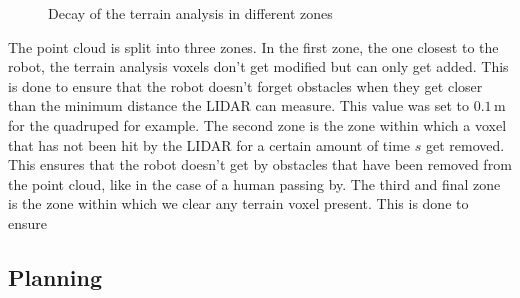 \documentclass[11pt]{article}
\begin{document}
        \begin{figure}[H]
            \centering
            \caption{Decay of the terrain analysis in different zones}
            \label{fig:decay}
        \end{figure}

        The point cloud is split into three zones. In the first zone, the one closest to the robot, the terrain analysis voxels don't get modified but can only get added. This is done to ensure that the robot doesn't forget obstacles when they get closer than the minimum distance the LIDAR can measure. This value was set to $0.1\,\text{m}$ for the quadruped for example.
        The second zone is the zone within which a voxel that has not been hit by the LIDAR for a certain amount of time $s$ get removed. This ensures that the robot doesn't get by obstacles that have been removed from the point cloud, like in the case of a human passing by. The third and final zone is the zone within which we clear any terrain voxel present. This is done to ensure

    \subsection{Planning}
\end{document}
